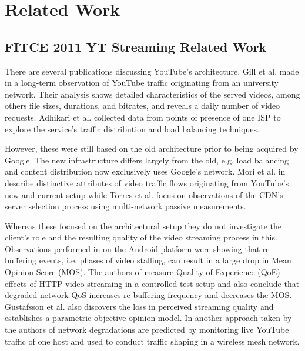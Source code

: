 \chapter{Related Work}
\label{chap:relatedwork}



\section{FITCE 2011 YT Streaming Related Work}

There are several publications discussing YouTube's architecture. Gill et al. made in \cite{gill2007youtube} a long-term observation of YouTube traffic originating from an university network. Their analysis shows detailed characteristics of the served videos, among others file sizes, durations, and bitrates, and reveals a daily number of video requests. Adhikari et al. \cite{adhikari2010youtube} collected data from points of presence of one ISP to explore the service's traffic distribution and load balancing techniques.

However, these were still based on the old architecture prior to being acquired by Google. The new infrastructure differs largely from the old, e.g. load balancing and content distribution now exclusively uses Google’s network. Mori et al. in \cite{mori2010characterizing} describe distinctive attributes of video traffic flows originating from YouTube's new and current setup while Torres et al. \cite{torres2011dissecting} focus on observations of the CDN's server selection process using multi-network passive measurements.


Whereas these focused on the architectural setup they do not investigate the client's role and the resulting quality of the video streaming process in this. 
Observations performed in \cite{ketyko2010qoe} on the Android platform were showing that re-buffering events, i.e. phases of video stalling, can result in a large drop in Mean Opinion Score (MOS). The authors of \cite{mokmeasuring} measure Quality of Experience (QoE) effects of HTTP video streaming in a controlled test setup and also conclude that degraded network QoS increases re-buffering frequency and decreases the MOS. Gustafsson et al. \cite{gustafsson2008measmmmquality} also discovers the loss in perceived streaming quality and establishes a parametric objective opinion model. In another approach taken by the authors of \cite{staehle2010yomo, staehle2011aquarema} network degradations are predicted by monitoring live YouTube traffic of one host and used to conduct traffic shaping in a wireless mesh network.


